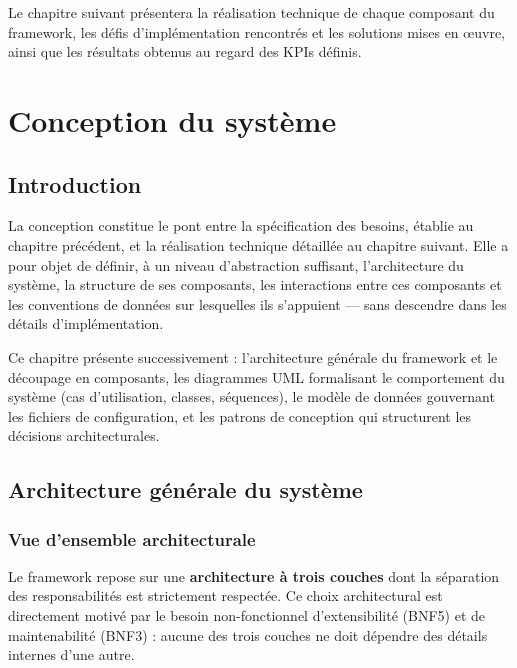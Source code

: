 \documentclass[12pt, a4paper]{report}
\begin{document}
Le chapitre suivant présentera la réalisation technique de chaque composant du framework, les défis d'implémentation rencontrés et les solutions mises en œuvre, ainsi que les résultats obtenus au regard des KPIs définis.

\chapter{Conception du système}

\section*{Introduction}

La conception constitue le pont entre la spécification des besoins, établie au chapitre précédent, et la réalisation technique détaillée au chapitre suivant. Elle a pour objet de définir, à un niveau d'abstraction suffisant, l'architecture du système, la structure de ses composants, les interactions entre ces composants et les conventions de données sur lesquelles ils s'appuient — sans descendre dans les détails d'implémentation.

Ce chapitre présente successivement : l'architecture générale du framework et le découpage en composants, les diagrammes UML formalisant le comportement du système (cas d'utilisation, classes, séquences), le modèle de données gouvernant les fichiers de configuration, et les patrons de conception qui structurent les décisions architecturales.

\section{Architecture générale du système}

\subsection{Vue d'ensemble architecturale}

Le framework repose sur une \textbf{architecture à trois couches} dont la séparation des responsabilités est strictement respectée. Ce choix architectural est directement motivé par le besoin non-fonctionnel d'extensibilité (BNF5) et de maintenabilité (BNF3) : aucune des trois couches ne doit dépendre des détails internes d'une autre.
\end{document}
